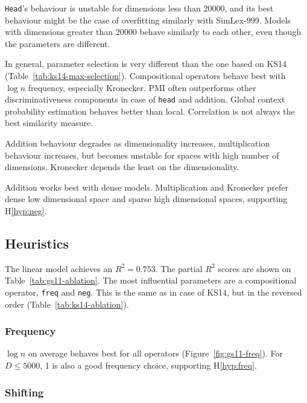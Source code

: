 \texttt{Head}'s behaviour is unstable for dimensions less than 20000, and its best behaviour might be the case of overfitting similarly with SimLex-999. Models with dimensions greater than 20000 behave similarly to each other, even though the parameters are different.

In general, parameter selection is very different than the one based on KS14 (Table~\ref{tab:ks14-max-selection}). Compositional operators behave best with $\log n$ frequency, especially Kronecker. PMI often outperforms other discriminativeness components in case of \texttt{head} and addition. Global context probability estimation behaves better than local. Correlation is not always the best similarity measure.

Addition behaviour degrades as dimensionality increases, multiplication behaviour increases, but becomes unstable for spaces with high number of dimensions. Kronecker depends the least on the dimensionality.

Addition works best with dense models. Multiplication and Kronecker prefer dense low dimensional space and sparse high dimensional spaces, supporting H\ref{hyp:neg}.

\subsection{Heuristics}
\label{sec:heuristics-gs11}



The linear model achieves an $R^2 = 0.753$. The partial $R^2$ scores are shown on Table~\ref{tab:gs11-ablation}. The most influential parameters are a compositional operator, \texttt{freq} and \texttt{neg}. This is the same as in case of KS14, but in the reversed order (Table~\ref{tab:ks14-ablation}).


\subsubsection{Frequency}



$\log n$ on average behaves best for all operators (Figure~\ref{fig:gs11-freq}). For $D \leq 5000$, 1 is also a good frequency choice, supporting H\ref{hyp:freq}.

\subsubsection{Shifting}

